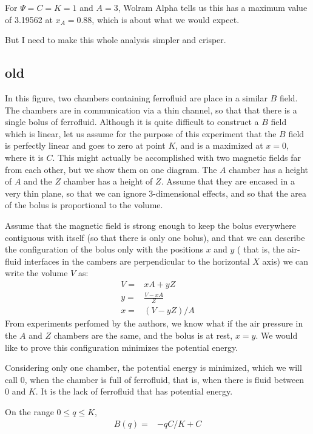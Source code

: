 \documentclass{asme2ej}
\begin{document}
For $\Psi = C = K = 1$ and $A = 3$, Wolram Alpha tells us this has a maximum value of
3.19562 at $x_A = 0.88$, which is about what we would expect.

But I need to make this whole analysis simpler and crisper.


\subsection{old}

In this figure, two chambers containing ferrofluid are place in a similar
$B$ field. The chambers are in communication via a thin channel, so that that
there is a single bolus of ferrofluid. Although it is quite difficult to
construct a $B$ field which is linear, let us assume for the purpose of this
experiment that the $B$ field is perfectly linear and goes to zero at
point $K$, and is a maximized at $x=0$, where it is $C$. This might actually
be accomplished with two magnetic fields far from each other, but we show
them on one diagram. The $A$ chamber has a height of $A$ and the $Z$ chamber
has a height of $Z$. Assume that they are encased in a very thin plane, so
that we can ignore 3-dimensional effects, and so that the area of the bolus
is proportional to the volume.

Assume that the magnetic field is strong enough to keep the bolus everywhere
contiguous with itself (so that there is only one bolus), and that we can
describe the configuration of the bolus only with the positions $x$ and $y$ (
that is, the air-fluid interfaces in the cambers are perpendicular to the horizontal $X$ axis)
we can write the
volume $V$ as:
\begin{align}
  V = & xA + yZ \\
  y = & \frac{V - xA}{Z} \\
  x = & (V - y Z)/A
  \label{eqn:yvalue}
\end{align}
From experiments perfomed by the authors, we know what if the air pressure in
the $A$ and $Z$ chambers are the same, and the bolus is at rest, $x = y$.
We would like to prove this configuration minimizes the potential energy.

Considering only one chamber, the potential energy is minimized, which
we will call $0$, when the chamber is full of ferrofluid, that is, when
there is fluid between 0 and $K$. It is the lack of ferrofluid that has
potential energy.

On the range $0 \leq q \leq K$,
\begin{align}
  B(q) = & -qC/K + C \\
\end{align}
\end{document}
